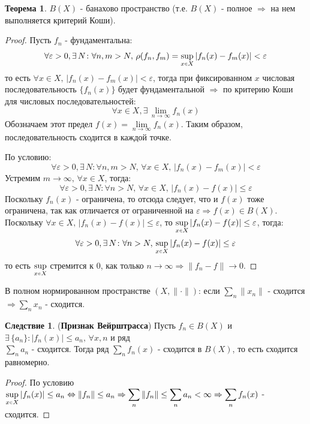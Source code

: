 \documentclass[12pt]{article}
\newcommand{\VE}{\varepsilon}
\theoremstyle{definition}
\newtheorem{theorem}{Теорема}
\newtheorem{corollary}{Следствие}
\newcommand{\smallerrel}[1]{\mathrel{\mathpalette\smallerrelaux{#1}}}
\newcommand{\smallerrelaux}[2]{\raisebox{.1ex}{\scalebox{.75}{$#1#2$}}}
\newcommand{\smallin}{\smallerrel{\in}}
\begin{document}
\begin{theorem}
	$B(X)$ - банахово пространство (т.е. $B(X)$ - полное $\Rightarrow$ на нем выполняется критерий Коши).
\end{theorem}
\begin{proof}
	Пусть $f_n$ - фундаментальна: 
	$$
		\forall \VE > 0, \exists \, N \colon \forall n,m > N, \, \rho(f_n,f_m) = \sup\limits_{x \smallin X}|f_n(x) - f_m(x)| < \VE
	$$
	то есть $\forall x \in X,\, |f_n(x) - f_m(x)| < \VE$, тогда при фиксированном $x$ числовая последовательность $\{f_n(x)\}$ будет фундаментальной $\Rightarrow$ по критерию Коши для числовых последовательностей: 
	$$
	\forall x \in X, \exists \, \lim\limits_{n \to \infty} f_n(x)
	$$
	Обозначаем этот предел $f(x) = \lim\limits_{n \to \infty} f_n(x)$. Таким образом, последовательность сходится в каждой точке.
	
	По условию:
	$$
		\forall \VE > 0, \exists \, N \colon \forall n,m > N, \, \forall x \in X,\,|f_n(x) - f_m(x)| < \VE
	$$
	Устремим $m \to \infty, \, \forall x \in X$, тогда:
	$$
		\forall \VE > 0, \exists \, N \colon \forall n > N, \, \forall x \in X,\,|f_n(x) - f(x)| \leq \VE
	$$
	Поскольку $f_n(x)$ - ограничена, то отсюда следует, что и $f(x)$ тоже ограничена, так как отличается от ограниченной на $ \VE \Rightarrow f(x) \in B(X)$. Поскольку $\forall x \in X,\,|f_n(x) - f(x)| 	\leq \VE$, то  $\sup\limits_{x \smallin X}|f_n(x) - f(x)| \leq \VE$, тогда:
	$$
		\forall \VE > 0, \exists \, N \colon \forall n > N, \, \sup\limits_{x \smallin X}|f_n(x) - f(x)| \leq \VE
	$$
	то есть $\sup\limits_{x \smallin X}$ стремится к $0$, как только $n \to \infty \Rightarrow \|f_n - f\| \to 0$.
\end{proof}
\newpage

В полном нормированном пространстве $(X, \|\cdot\|)$: если $\displaystyle \sum\limits_n\|x_n\|$ - сходится $\Rightarrow \displaystyle \sum\limits_n x_n$ - сходится.
\begin{corollary}(\textbf{Признак Вейрштрасса})
	Пусть $f_n \in B(X)$ и $\exists \, \{a_n\} \colon |f_n(x)|\leq a_n, \, \forall x,n$ и ряд\\ $\displaystyle \sum\limits_n a_n$ - сходится. Тогда ряд $\displaystyle \sum\limits_n f_n(x)$ - сходится в $B(X)$, то есть сходится равномерно.
\end{corollary}
\begin{proof}
	По условию $\sup\limits_{x \smallin X}|f_n(x)| \leq a_n \Leftrightarrow \|f_n\| \leq a_n \Rightarrow \displaystyle \sum\limits_n \|f_n\| \leq \displaystyle \sum\limits_n a_n < \infty \Rightarrow \displaystyle \sum\limits_n f_n(x)$ - сходится.
\end{proof}
\end{document}
